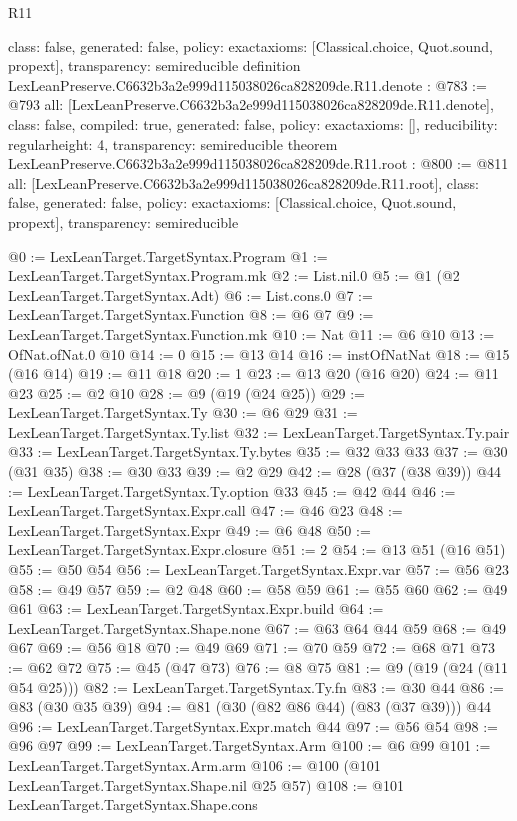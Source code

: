 \begin{lexlean}{R11}
\begin{coremodule}
{  class: false,
  generated: false,
  policy: exact{axioms: [Classical.choice, Quot.sound, propext]},
  transparency: semireducible
}
definition LexLeanPreserve.C6632b3a2e999d115038026ca828209de.R11.denote : @783 := @793 {
  all: [LexLeanPreserve.C6632b3a2e999d115038026ca828209de.R11.denote],
  class: false,
  compiled: true,
  generated: false,
  policy: exact{axioms: []},
  reducibility: regular{height: 4},
  transparency: semireducible
}
theorem LexLeanPreserve.C6632b3a2e999d115038026ca828209de.R11.root : @800 := @811 {
  all: [LexLeanPreserve.C6632b3a2e999d115038026ca828209de.R11.root],
  class: false,
  generated: false,
  policy: exact{axioms: [Classical.choice, Quot.sound, propext]},
  transparency: semireducible
}

@0 := LexLeanTarget.TargetSyntax.Program
@1 := LexLeanTarget.TargetSyntax.Program.mk
@2 := List.nil.{0}
@5 := @1 (@2 LexLeanTarget.TargetSyntax.Adt)
@6 := List.cons.{0}
@7 := LexLeanTarget.TargetSyntax.Function
@8 := @6 @7
@9 := LexLeanTarget.TargetSyntax.Function.mk
@10 := Nat
@11 := @6 @10
@13 := OfNat.ofNat.{0} @10
@14 := 0
@15 := @13 @14
@16 := instOfNatNat
@18 := @15 (@16 @14)
@19 := @11 @18
@20 := 1
@23 := @13 @20 (@16 @20)
@24 := @11 @23
@25 := @2 @10
@28 := @9 (@19 (@24 @25))
@29 := LexLeanTarget.TargetSyntax.Ty
@30 := @6 @29
@31 := LexLeanTarget.TargetSyntax.Ty.list
@32 := LexLeanTarget.TargetSyntax.Ty.pair
@33 := LexLeanTarget.TargetSyntax.Ty.bytes
@35 := @32 @33 @33
@37 := @30 (@31 @35)
@38 := @30 @33
@39 := @2 @29
@42 := @28 (@37 (@38 @39))
@44 := LexLeanTarget.TargetSyntax.Ty.option @33
@45 := @42 @44
@46 := LexLeanTarget.TargetSyntax.Expr.call
@47 := @46 @23
@48 := LexLeanTarget.TargetSyntax.Expr
@49 := @6 @48
@50 := LexLeanTarget.TargetSyntax.Expr.closure
@51 := 2
@54 := @13 @51 (@16 @51)
@55 := @50 @54
@56 := LexLeanTarget.TargetSyntax.Expr.var
@57 := @56 @23
@58 := @49 @57
@59 := @2 @48
@60 := @58 @59
@61 := @55 @60
@62 := @49 @61
@63 := LexLeanTarget.TargetSyntax.Expr.build
@64 := LexLeanTarget.TargetSyntax.Shape.none
@67 := @63 @64 @44 @59
@68 := @49 @67
@69 := @56 @18
@70 := @49 @69
@71 := @70 @59
@72 := @68 @71
@73 := @62 @72
@75 := @45 (@47 @73)
@76 := @8 @75
@81 := @9 (@19 (@24 (@11 @54 @25)))
@82 := LexLeanTarget.TargetSyntax.Ty.fn
@83 := @30 @44
@86 := @83 (@30 @35 @39)
@94 := @81 (@30 (@82 @86 @44) (@83 (@37 @39))) @44
@96 := LexLeanTarget.TargetSyntax.Expr.match @44
@97 := @56 @54
@98 := @96 @97
@99 := LexLeanTarget.TargetSyntax.Arm
@100 := @6 @99
@101 := LexLeanTarget.TargetSyntax.Arm.arm
@106 := @100 (@101 LexLeanTarget.TargetSyntax.Shape.nil @25 @57)
@108 := @101 LexLeanTarget.TargetSyntax.Shape.cons

\end{coremodule}
\end{lexlean}
